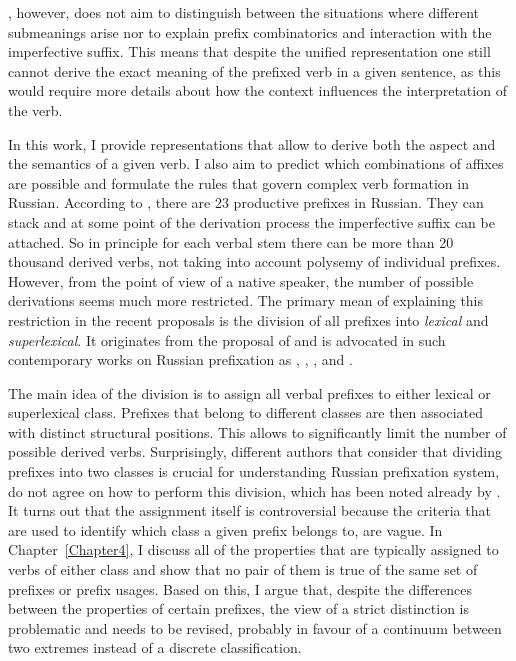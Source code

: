 \citet{Kagan:book}, however, does not aim to distinguish between the situations where different submeanings arise nor to explain prefix combinatorics and interaction with the imperfective suffix. This means that despite the unified representation one still cannot derive the exact meaning of the prefixed verb in a given sentence, as this would require more details about how the context influences the interpretation of the verb.

In this work, I provide representations that allow to derive both the aspect and the semantics of a given verb. I also aim to predict which combinations of affixes are possible and formulate the rules that govern complex verb formation in Russian. According to \citet{Shvedova:82}, there are 23 productive prefixes in Russian. They can stack and at some point of the derivation process the imperfective suffix can be attached. So in principle for each verbal stem there can be more than 20 thousand derived verbs, not taking into account polysemy of individual prefixes. However, from the point of view of a native speaker, the number of possible derivations seems much more restricted. The primary mean of explaining this restriction in the recent proposals is the division of all prefixes into \textit{lexical} and \textit{superlexical}. It originates from the proposal of \citet{Isachenko:60} and is advocated in such contemporary works on Russian prefixation as \citet{Ramchand:04}, \citet{Svenonius:04b}, \citet{Romanova:06}, and \citet{Tatevosov:07, Tatevosov:09}.

The main idea of the division is to assign all verbal prefixes to either lexical or superlexical class. Prefixes that belong to different classes are then associated with distinct structural positions. This allows to significantly limit the number of possible derived verbs. Surprisingly, different authors that consider that dividing prefixes into two classes is crucial for understanding Russian prefixation system, do not agree on how to perform this division, which has been noted already by \citet{Tatevosov:09}. It turns out that the assignment itself is controversial because the criteria that are used to identify which class a given prefix belongs to, are vague. In Chapter~\ref{Chapter4}, I discuss all of the properties that are typically assigned to verbs of either class and show that no pair of them is true of the same set of prefixes or prefix usages. Based on this, I argue that, despite the differences between the properties of certain prefixes, the view of a strict distinction is problematic and needs to be revised, probably in favour of a continuum between two extremes instead of a discrete classification. 

